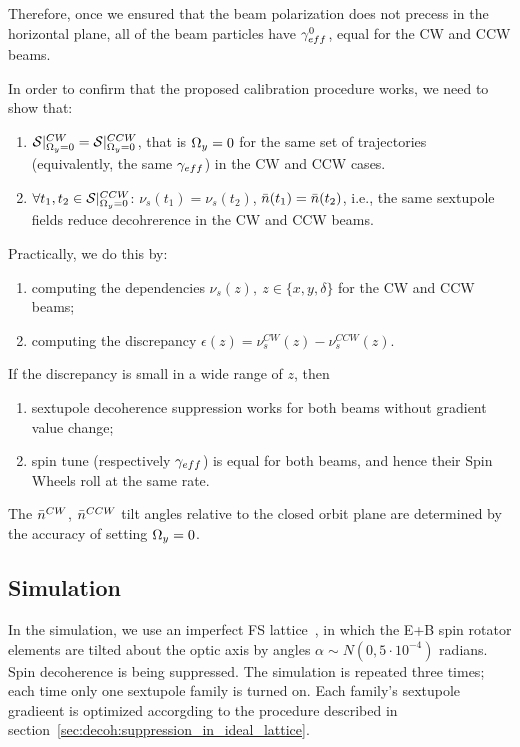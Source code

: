 Therefore, once we ensured that the beam polarization does not precess in the horizontal plane,
all of the beam particles have $\g*^0$, equal for the CW and CCW beams.


In order to confirm that the proposed calibration procedure works, we need to show that:
\begin{enumerate}
\item $\Stab*^{CW} = \Stab*^{CCW}$, that is $\Omega_y=0$ for the same set of trajectories (equivalently,
  the same $\g*$) in the CW and CCW cases.
\item $\forall t_1,t_2\in\Stab*^{CCW}$: $\nu_s(t_1) = \nu_s(t_2)$, $\bar n(t_1) = \bar n(t_2)$, i.e., the same
  sextupole fields reduce decohrerence in the CW and CCW beams.
\end{enumerate}

Practically, we do this by:
\begin{enumerate}
\item computing the dependencies $\nu_s(z),~z\in\{x,y,\delta\}$ for the CW and CCW beams;
\item computing the discrepancy $\epsilon(z) = \nu_s^{CW}(z) - \nu_s^{CCW}(z)$.
\end{enumerate}

If the discrepancy is small in a wide range of $z$, then
\begin{enumerate}
\item sextupole decoherence suppression works for both beams without gradient value change;
\item spin tune (respectively $\g*$) is equal for both beams, and hence their Spin Wheels roll at the
  same rate.
\end{enumerate}

The $\bar n^{CW}$, $\bar n^{CCW}$ tilt angles relative to the closed orbit plane are determined by the accuracy of
setting $\Omega_y=0$.

\subsection{Simulation}
In the simulation, we use an imperfect FS lattice~\cite{Senichev:ICAP15-MODBC4}, in which the E+B
spin rotator elements are tilted about the optic axis by angles $\alpha\sim N(0, 5\cdot 10^{-4})$ radians.
Spin decoherence is being suppressed. The simulation is repeated three times;
each time only one sextupole family is turned on.
Each family's sextupole gradieent is optimized accorgding to the procedure
described in section~\ref{sec:decoh:suppression_in_ideal_lattice}.

